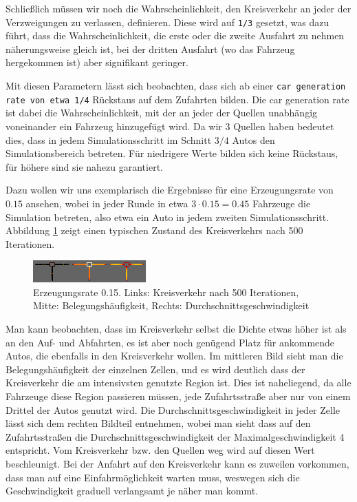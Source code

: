 \documentclass[11pt, a4paper]{article}
\begin{document}
Schließlich müssen wir noch die Wahrscheinlichkeit, den Kreisverkehr an jeder der Verzweigungen zu verlassen, definieren. Diese wird auf \texttt{1/3} gesetzt, was dazu führt, dass die Wahrscheinlichkeit, die erste oder die zweite Ausfahrt zu nehmen näherungsweise gleich ist, bei der dritten Ausfahrt (wo das Fahrzeug hergekommen ist) aber signifikant geringer.

Mit diesen Parametern lässt sich beobachten, dass sich ab einer \texttt{car generation rate von etwa 1/4} Rückstaus auf dem Zufahrten bilden. Die car generation rate ist dabei die Wahrscheinlichkeit, mit der an jeder der Quellen unabhängig voneinander ein Fahrzeug hinzugefügt wird. Da wir 3 Quellen haben bedeutet dies, dass in jedem Simulationsschritt im Schnitt $3/4$ Autos den Simulationsbereich betreten. Für niedrigere Werte bilden sich keine Rückstaus, für höhere sind sie nahezu garantiert.

Dazu wollen wir uns exemplarisch die Ergebnisse für eine Erzeugungsrate von $0.15$ ansehen, wobei in jeder Runde in etwa $3 \cdot 0.15 = 0.45$ Fahrzeuge die Simulation betreten, also etwa ein Auto in jedem zweiten Simulationsschritt. Abbildung \ref{fig:roundabout015} zeigt einen typischen Zustand des Kreisverkehrs nach 500 Iterationen.

\begin{figure}[h!]
	\centering
	\includegraphics[width=\textwidth]{img/roundabout_015}
	\caption{Erzeugungsrate 0.15. Links: Kreisverkehr nach 500 Iterationen, Mitte: Belegungshäufigkeit, Rechts: Durchschnittsgeschwindigkeit}
	\label{fig:roundabout015}
\end{figure}

Man kann beobachten, dass im Kreisverkehr selbst die Dichte etwas höher ist als an den Auf- und Abfahrten, es ist aber noch genügend Platz für ankommende Autos, die ebenfalls in den Kreisverkehr wollen. Im mittleren Bild sieht man die Belegungshäufigkeit der einzelnen Zellen, und es wird deutlich dass der Kreisverkehr die am intensivsten genutzte Region ist. Dies ist naheliegend, da alle Fahrzeuge diese Region passieren müssen, jede Zufahrtsstraße aber nur von einem Drittel der Autos genutzt wird. Die Durchschnittsgeschwindigkeit in jeder Zelle lässt sich dem rechten Bildteil entnehmen, wobei man sieht dass auf den Zufahrtsstraßen die Durchschnittsgeschwindigkeit der Maximalgeschwindigkeit 4 entspricht. Vom Kreisverkehr bzw. den Quellen weg wird auf diesen Wert beschleunigt. Bei der Anfahrt auf den Kreisverkehr kann es zuweilen vorkommen, dass man auf eine Einfahrmöglichkeit warten muss, weswegen sich die Geschwindigkeit graduell verlangsamt je näher man kommt.
\end{document}
